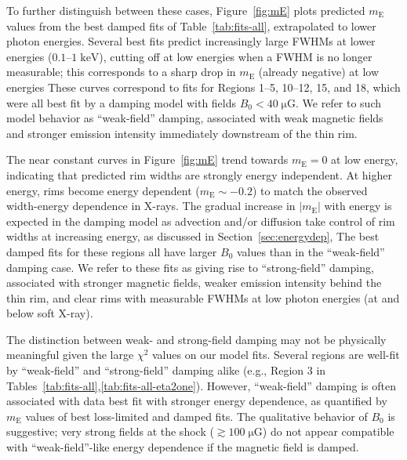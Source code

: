 \documentclass[iop, apj, numberedappendix]{emulateapj}
\newcommand*{\mt}{\mathrm}
\newcommand*{\unit}[1]{\;\mt{#1}}  %
\newcommand*{\mE}{m_\mt{E}}
\newcommand*{\muG}{\unit{\mu G}}
\begin{document}
To further distinguish between these cases, Figure~\ref{fig:mE} plots predicted
$\mE$ values from the best damped fits of Table~\ref{tab:fits-all},
extrapolated to lower photon energies.  Several best fits predict increasingly
large FWHMs at lower energies ($0.1$--$1 \unit{keV}$), cutting off at low
energies when a FWHM is no longer measurable; this corresponds to a sharp
drop in $\mE$ (already negative) at low energies These curves correspond to
fits for Regions 1--5, 10--12, 15, and 18, which were all best fit by a
damping model with fields $B_0 < 40 \muG$.  We refer to such model behavior as
``weak-field'' damping, associated with weak magnetic fields and stronger
emission intensity immediately downstream of the thin rim.

The near constant curves in Figure~\ref{fig:mE} trend towards $\mE = 0$ at low
energy, indicating that predicted rim widths are strongly energy independent.
At higher energy, rims become energy dependent ($\mE \sim -0.2$) to match the
observed width-energy dependence in X-rays.  The gradual increase in $|\mE|$
with energy is expected in the damping model as advection and/or diffusion take
control of rim widths at increasing energy, as discussed in
Section~\ref{sec:energydep},  The best damped fits for these regions all have
larger $B_0$ values than in the ``weak-field'' damping case.  We refer to these
fits as giving rise to ``strong-field'' damping, associated with stronger
magnetic fields, weaker emission intensity behind the thin rim, and clear rims
with measurable FWHMs at low photon energies (at and below soft X-ray).

The distinction between weak- and strong-field damping may not
be physically meaningful given the large $\chi^2$ values on our model fits.
Several regions are well-fit by ``weak-field'' and ``strong-field'' damping
alike (e.g., Region 3 in Tables~\ref{tab:fits-all},\ref{tab:fits-all-eta2one}).
However, ``weak-field'' damping is often associated with data best fit with
stronger energy dependence, as quantified by $\mE$ values of best loss-limited
and damped fits.  The qualitative behavior of $B_0$ is suggestive; very strong
fields at the shock ($\gtrsim 100 \muG$) do not appear compatible with
``weak-field''-like energy dependence if the magnetic field is damped.

\end{document}
